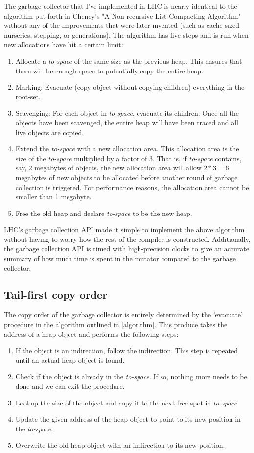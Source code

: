\documentclass[a4paper,oneside]{memoir}
\begin{document}
The garbage collector that I've implemented in LHC is nearly identical to the
algorithm put forth in Cheney's "A Non-recursive List Compacting Algorithm"
without any of the improvements that were later invented (such as cache-sized
nurseries, stepping, or generations). The algorithm has five steps and is run
when new allocations have hit a certain limit:
\begin{enumerate}
  \item Allocate a \emph{to-space} of the same size as the previous heap. This
  ensures that there will be enough space to potentially copy the entire heap.
  \item Marking: Evacuate (copy object without copying children) everything in the root-set.
  \item Scavenging: For each object in \emph{to-space}, evacuate its children. Once all
  the objects have been scavenged, the entire heap will have been traced and all
  live objects are copied.
  \item Extend the \emph{to-space} with a new allocation area. This allocation
  area is the size of the \emph{to-space} multiplied by a factor of 3. That is,
  if \emph{to-space} contains, say, 2 megabytes of objects, the new allocation
  area will allow $2*3=6$ megabytes of new objects to be allocated before another
  round of garbage collection is triggered. For performance reasons, the allocation
  area cannot be smaller than 1 megabyte.
  \item Free the old heap and declare \emph{to-space} to be the new heap.
\end{enumerate}

LHC's garbage collection API made it simple to implement the above algorithm
without having to worry how the rest of the compiler is constructed.
Additionally, the garbage collection API is timed with high-precision clocks
to give an accurate summary of how much time is spent in the mutator compared to
the garbage collector.

\subsection{Tail-first copy order}

The copy order of the garbage collector is entirely determined by the 'evacuate'
procedure in the algorithm outlined in \ref{algorithm}. This produce takes the
address of a heap object and performs the following steps:
\begin{enumerate}
  \item If the object is an indirection, follow the indirection. This step is
  repeated until an actual heap object is found.
  \item Check if the object is already in the \emph{to-space}. If so, nothing
  more needs to be done and we can exit the procedure.
  \item Lookup the size of the object and copy it to the next free spot in
  \emph{to-space}.
  \item Update the given address of the heap object to point to its new position
  in the \emph{to-space}.
  \item Overwrite the old heap object with an indirection to its new position.
\end{enumerate}
\end{document}
